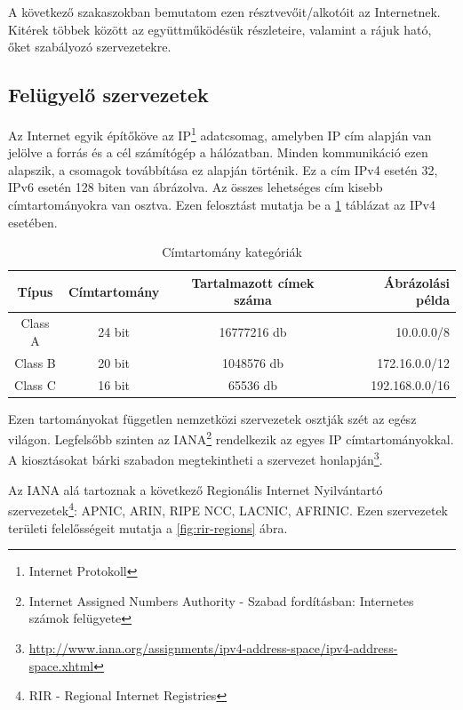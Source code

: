 A következő szakaszokban bemutatom ezen résztvevőit/alkotóit az Internetnek. Kitérek többek között az együttműködésük részleteire, valamint a rájuk ható, őket szabályozó szervezetekre.

\subsection{Felügyelő szervezetek}
Az Internet egyik építőköve az IP\footnote{Internet Protokoll} adatcsomag, amelyben IP cím alapján van jelölve a forrás és a cél számítógép a hálózatban. Minden kommunikáció ezen alapszik, a csomagok továbbítása ez alapján történik. Ez a cím IPv4 esetén 32, IPv6 esetén 128 biten van ábrázolva. Az összes lehetséges cím kisebb címtartományokra van osztva. Ezen felosztást mutatja be a \ref{tab:cimtartomanyok} táblázat az IPv4 esetében.

\begin{table}[ht]
	\centering
	\caption{Címtartomány kategóriák}
	\hspace{2mm}
	\begin{tabular}{ | c | c | c | r |}
	\hline
	Típus & Címtartomány & Tartalmazott címek száma & Ábrázolási példa \\ \hline

Class A & 24 bit & 16777216 db & 10.0.0.0/8\\ \hline
Class B & 20 bit & 1048576 db & 172.16.0.0/12\\ \hline
Class C & 16 bit & 65536 db & 192.168.0.0/16\\ \hline
	\end{tabular}
	\label{tab:cimtartomanyok}
\end{table}


Ezen tartományokat független nemzetközi szervezetek osztják szét az egész világon. Legfelsőbb szinten az IANA\footnote{Internet Assigned Numbers Authority - Szabad fordításban: Internetes számok felügyete} rendelkezik az egyes IP címtartományokkal. A kiosztásokat bárki szabadon megtekintheti a szervezet honlapján\footnote{\url{http://www.iana.org/assignments/ipv4-address-space/ipv4-address-space.xhtml}}.

Az IANA alá tartoznak a következő Regionális Internet Nyilvántartó szervezetek\footnote{RIR - Regional Internet Registries}: APNIC, ARIN, RIPE NCC, LACNIC, AFRINIC.
Ezen szervezetek területi felelősségeit mutatja a \ref{fig:rir-regions} ábra.

